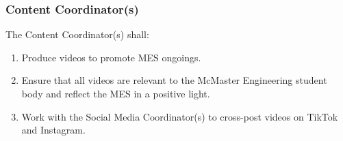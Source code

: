 
\subsubsection{Content Coordinator(s)}
\label{content-coordinators}
The Content Coordinator(s) shall:

\begin{enumerate}
 \item Produce videos to promote MES ongoings.
 \item Ensure that all videos are relevant to the McMaster Engineering student body and reflect the MES in a positive light.
 \item Work with the Social Media Coordinator(s) to cross-post videos on TikTok and Instagram.
\end{enumerate}